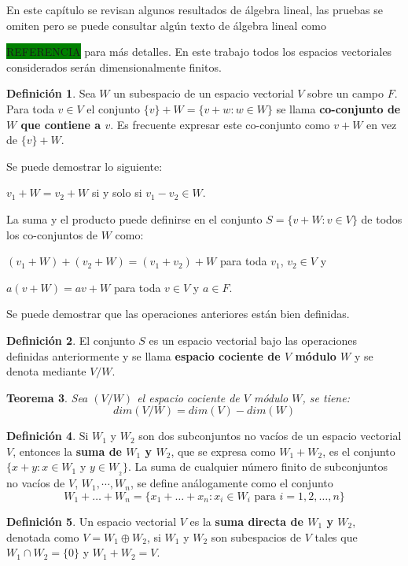 \documentclass[12pt]{book}
\newtheorem{theorem}{Teorema}[section]
\theoremstyle{definition}
\newtheorem{definition}[theorem]{Definición}
\newcounter{in}
\newcounter{ini}
\begin{document}
En este capítulo se revisan algunos resultados de álgebra lineal, las
pruebas se omiten pero se puede consultar algún texto de álgebra
lineal como {\setlength{\fboxsep}{0pt}\colorbox{green}{REFERENCIA}
  para más  detalles. En este trabajo todos los espacios vectoriales considerados serán dimensionalmente finitos.

\begin{definition}
  Sea $W$ un subespacio de un espacio vectorial $V$ sobre un campo
  $F$. Para toda $v\in V$ el conjunto $\{v\}+W=\{v+w:w\in W\}$ se
  llama \textbf{co-conjunto de $W$ que contiene a $v$}. Es frecuente
  expresar este co-conjunto como $v+W$ en vez de $\{v\}+W$. 
\end{definition}

Se puede demostrar lo siguiente:
 
$v_{1}+W=v_{2}+W$ si y solo si $v_{1}-v_{2}\in W.$

La suma y el producto puede definirse en el conjunto $S=\{v+W:v\in V\}$ de todos los co-conjuntos de $W$ como: 

$(v_{1}+W)+(v_{2}+W)=(v_{1}+v_{2})+W$ para toda $v_{1}$, $v_{2}\in V$ y

$a(v+W)=av+W$ para toda $v\in V$ y $a\in F$.

Se puede demostrar que las operaciones anteriores están bien definidas.

\begin{definition}
  El conjunto $S$ es un espacio vectorial bajo las operaciones
  definidas anteriormente y se llama \textbf{espacio cociente de $V$ módulo $W$} y se denota mediante $V/W$. 
\end{definition}

\begin{theorem}
  Sea $(V/W)$ el espacio cociente de $V$ módulo $W$, se tiene:
  $$dim (V/W)=dim(V)-dim(W)$$
\end{theorem}

\begin{definition}
  Si $W_{1}$ y $W_{2}$ son dos subconjuntos no vacíos de un espacio
  vectorial $V$, entonces la \textbf{suma de $W_{1}$ y $W_{2}$}, que se
  expresa como $W_{1}+W_{2}$, es el conjunto $\{x+y:x\in W_{1}$ y $y\in
  W_{_2}\}$. La suma de cualquier número finito de subconjuntos no
  vacíos de $V$, $W_{1},\cdots,W_{n}$, se define análogamente como el
  conjunto
  $$W_{1}+\ldots+W_{n}=\{x_{1}+\ldots+x_{n}: x_{i}\in W_{i} \mbox{ para }i=1,2,\ldots,n\}$$
\end{definition}

\begin{definition}
  Un espacio vectorial $V$ es la \textbf{suma directa de $W_{1}$ y
  $W_{2}$}, denotada como $V=W_{1}\oplus W_{2}$, si $W_{1}$ y $W_{2}$
son subespacios de $V$ tales que $W_{1}\cap W_{2}=\{0\}$ y $W_{1}+W_{2}=V.$ 
\end{definition}

}
\end{document}
